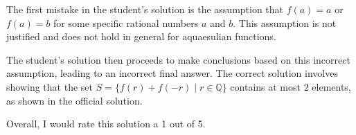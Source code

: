 The first mistake in the student's solution is the assumption that $f(a) = a$ or $f(a) = b$ for some specific rational numbers $a$ and $b$. This assumption is not justified and does not hold in general for aquaesulian functions.

The student's solution then proceeds to make conclusions based on this incorrect assumption, leading to an incorrect final answer. The correct solution involves showing that the set $S = \{f(r) + f(-r) \mid r \in \mathbb{Q}\}$ contains at most $2$ elements, as shown in the official solution. 

Overall, I would rate this solution a 1 out of 5.
